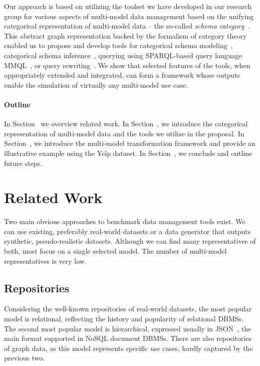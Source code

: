 Our approach is based on utilizing the toolset we have developed in our research group for various aspects of multi-model data management based on the unifying categorical representation of multi-model data -- the so-called \textit{schema category}~\citep{mm_cat_journal}. 
This abstract graph representation backed by the formalism of category theory enabled us to propose and develop tools for categorical schema modeling~\citep{cikm_2022}, categorical schema inference~\citep{mm_infer}, querying using SPARQL-based query language MMQL~\citep{koupil2023universal}, or query rewriting~\citep{edbt_2024}. We show that selected features of the tools, when appropriately extended and integrated, can form a framework whose outputs enable the simulation of virtually any multi-model use case.

\paragraph{Outline} In Section~ we overview related work.
In Section~, we introduce the categorical representation of multi-model data and the tools we utilize in the proposal.
In Section~, we introduce the multi-model transformation framework and provide an illustrative example using the Yelp dataset.
In Section~, we conclude and outline future steps.

\section{Related Work}
Two main obvious approaches to benchmark data management tools exist. We can use existing, preferably real-world datasets or a data generator that outputs synthetic, pseudo-realistic datasets. Although we can find many representatives of both, most focus on a single selected model. The number of multi-model representatives is very low.

\subsection{Repositories}

Considering the well-known repositories of real-world datasets, the most popular model is relational, reflecting the history and popularity of relational DBMSs. The second most popular model is hierarchical, expressed usually in JSON~\citep{JSON}, the main format supported in NoSQL document DBMSs. There are also repositories of graph data, as this model represents specific use cases, hardly captured by the previous two. %

